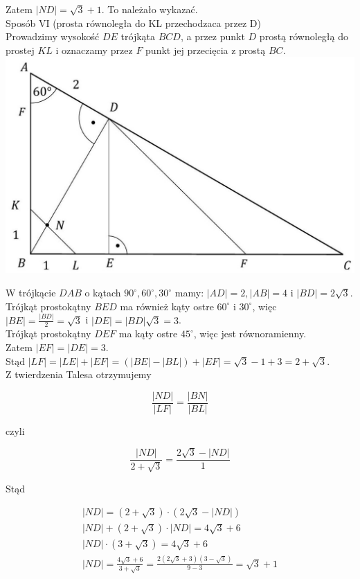 \documentclass[10pt]{article}
\begin{document}
Zatem $|N D|=\sqrt{3}+1$. To należało wykazać.\\
Sposób VI (prosta równoległa do KL przechodzaca przez D)\\
Prowadzimy wysokość $D E$ trójkąta $B C D$, a przez punkt $D$ prostą równoległą do prostej $K L$ i oznaczamy przez $F$ punkt jej przecięcia z prostą $B C$.\\
\includegraphics[max width=\textwidth, center]{2025_02_07_dcb3d059df06a3930b0ag-12}

W trójkącie $D A B$ o kątach $90^{\circ}, 60^{\circ}, 30^{\circ}$ mamy: $|A D|=2,|A B|=4$ i $|B D|=2 \sqrt{3}$.\\
Trójkąt prostokątny $B E D$ ma również kąty ostre $60^{\circ}$ i $30^{\circ}$, więc $|B E|=\frac{|B D|}{2}=\sqrt{3}$ i $|D E|=|B D| \sqrt{3}=3$.\\
Trójkąt prostokątny $D E F$ ma kąty ostre $45^{\circ}$, więc jest równoramienny.\\
Zatem $|E F|=|D E|=3$.\\
Stąd $|L F|=|L E|+|E F|=(|B E|-|B L|)+|E F|=\sqrt{3}-1+3=2+\sqrt{3}$.\\
Z twierdzenia Talesa otrzymujemy

$$
\frac{|N D|}{|L F|}=\frac{|B N|}{|B L|}
$$

czyli

$$
\frac{|N D|}{2+\sqrt{3}}=\frac{2 \sqrt{3}-|N D|}{1}
$$

Stąd

$$
\begin{gathered}
|N D|=(2+\sqrt{3}) \cdot(2 \sqrt{3}-|N D|) \\
|N D|+(2+\sqrt{3}) \cdot|N D|=4 \sqrt{3}+6 \\
|N D| \cdot(3+\sqrt{3})=4 \sqrt{3}+6 \\
|N D|=\frac{4 \sqrt{3}+6}{3+\sqrt{3}}=\frac{2(2 \sqrt{3}+3)(3-\sqrt{3})}{9-3}=\sqrt{3}+1
\end{gathered}
$$
\end{document}
